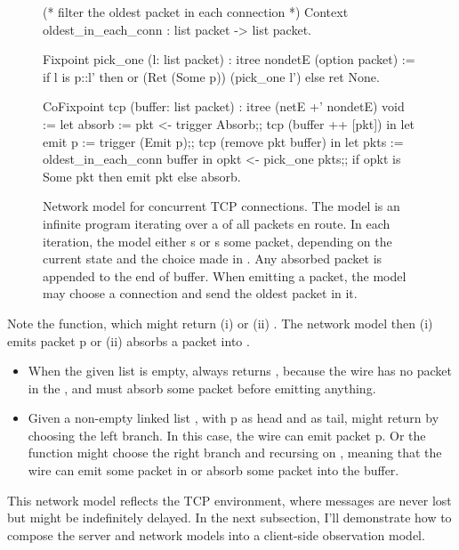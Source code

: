 \begin{figure}
\begin{coq}
(* filter the oldest packet in each connection *)
Context oldest_in_each_conn : list packet -> list packet.

Fixpoint pick_one (l: list packet) : itree nondetE (option packet) :=%
  if l is p::l'
  then or (Ret (Some p)) (pick_one l')
  else ret None.

CoFixpoint tcp (buffer: list packet) : itree (netE +' nondetE) void :=
  let absorb := pkt <- trigger Absorb;;
                tcp (buffer ++ [pkt])      in
  let emit p := trigger (Emit p);;
                tcp (remove pkt buffer)    in
  let pkts   := oldest_in_each_conn buffer in
  opkt <- pick_one pkts;;
  if opkt is Some pkt
  then emit pkt
  else absorb.
\end{coq}
\vspace*{1em}
\caption[Network model for concurrent TCP connections]{Network model for
  concurrent TCP connections.  The model is an infinite program iterating over a
   of all packets en route.  In each iteration, the model either
  s or s some packet, depending on the current
   state and the choice made in .  Any absorbed packet
  is appended to the end of buffer.  When emitting a packet, the model may
  choose a connection and send the oldest packet in it.}
\label{fig:tcp-model}
\end{figure}

Note the  function, which might return (i)  or (ii)
.  The network model then (i) emits packet \ilc p or (ii) absorbs a
packet into .

\begin{itemize}
\item When the given list  is empty,  always returns
  , because the wire has no packet in the , and must
  absorb some packet before emitting anything.
\item Given a non-empty linked list , with \ilc p as head and
   as tail,  might return  by choosing the
  left branch.  In this case, the wire can emit packet \ilc p.  Or the function
  might choose the right branch and recursing on , meaning that the wire
  can emit some packet in  or absorb some packet into the buffer.
\end{itemize}

This network model reflects the TCP environment, where messages are never lost
but might be indefinitely delayed.  In the next subsection, I'll demonstrate how
to compose the server and network models into a client-side observation model.

